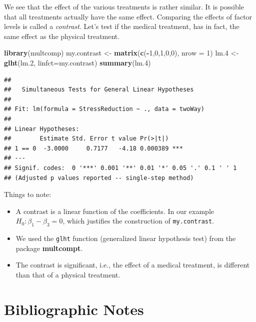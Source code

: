\documentclass[]{book}
\newenvironment{Shaded}{\begin{snugshade}}{\end{snugshade}}
\newcommand{\KeywordTok}[1]{\textcolor[rgb]{0.13,0.29,0.53}{\textbf{#1}}}
\newcommand{\DataTypeTok}[1]{\textcolor[rgb]{0.13,0.29,0.53}{#1}}
\newcommand{\DecValTok}[1]{\textcolor[rgb]{0.00,0.00,0.81}{#1}}
\newcommand{\StringTok}[1]{\textcolor[rgb]{0.31,0.60,0.02}{#1}}
\newcommand{\OperatorTok}[1]{\textcolor[rgb]{0.81,0.36,0.00}{\textbf{#1}}}
\newcommand{\NormalTok}[1]{#1}
\providecommand{\tightlist}{%
  \setlength{\itemsep}{0pt}\setlength{\parskip}{0pt}}
\theoremstyle{definition}
\theoremstyle{definition}
\theoremstyle{definition}
\theoremstyle{remark}
\begin{document}
We see that the effect of the various treatments is rather similar. It
is possible that all treatments actually have the same effect. Comparing
the effects of factor levels is called a \emph{contrast}. Let's test if
the medical treatment, has in fact, the same effect as the physical
treatment.

\begin{Shaded}
\begin{Highlighting}[]
\KeywordTok{library}\NormalTok{(multcomp)}
\NormalTok{my.contrast <-}\StringTok{ }\KeywordTok{matrix}\NormalTok{(}\KeywordTok{c}\NormalTok{(}\OperatorTok{-}\DecValTok{1}\NormalTok{,}\DecValTok{0}\NormalTok{,}\DecValTok{1}\NormalTok{,}\DecValTok{0}\NormalTok{,}\DecValTok{0}\NormalTok{), }\DataTypeTok{nrow =}  \DecValTok{1}\NormalTok{)}
\NormalTok{lm.}\DecValTok{4}\NormalTok{ <-}\StringTok{ }\KeywordTok{glht}\NormalTok{(lm.}\DecValTok{2}\NormalTok{, }\DataTypeTok{linfct=}\NormalTok{my.contrast)}
\KeywordTok{summary}\NormalTok{(lm.}\DecValTok{4}\NormalTok{)}
\end{Highlighting}
\end{Shaded}

\begin{verbatim}
## 
##   Simultaneous Tests for General Linear Hypotheses
## 
## Fit: lm(formula = StressReduction ~ ., data = twoWay)
## 
## Linear Hypotheses:
##        Estimate Std. Error t value Pr(>|t|)    
## 1 == 0  -3.0000     0.7177   -4.18 0.000389 ***
## ---
## Signif. codes:  0 '***' 0.001 '**' 0.01 '*' 0.05 '.' 0.1 ' ' 1
## (Adjusted p values reported -- single-step method)
\end{verbatim}

Things to note:

\begin{itemize}
\tightlist
\item
  A contrast is a linear function of the coefficients. In our example
  \(H_0:\beta_1-\beta_3=0\), which justifies the construction of
  \texttt{my.contrast}.
\item
  We used the \texttt{glht} function (generalized linear hypothesis
  test) from the package \textbf{multcompt}.
\item
  The contrast is significant, i.e., the effect of a medical treatment,
  is different than that of a physical treatment.
\end{itemize}

\section{Bibliographic Notes}\label{bibliographic-notes-4}
\end{document}
